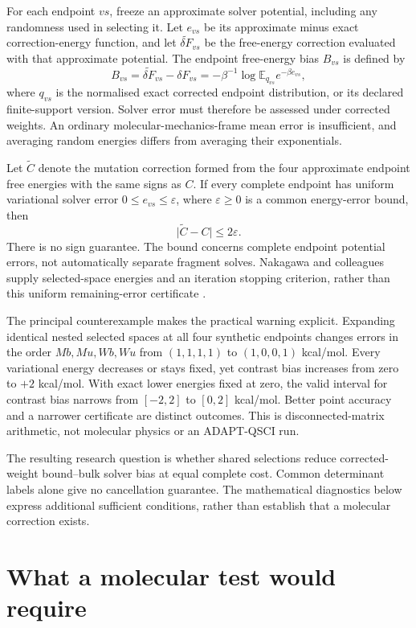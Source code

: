 \documentclass{article}
\begin{document}
For each endpoint \(vs\), freeze an approximate solver potential, including any randomness used in selecting it. Let \(e_{vs}\) be its approximate minus exact correction-energy function, and let \(\widetilde{\delta F}_{vs}\) be the free-energy correction evaluated with that approximate potential. The endpoint free-energy bias \(B_{vs}\) is defined by
\[
B_{vs}=\widetilde{\delta F}_{vs}-\delta F_{vs}
 =-\beta^{-1}\log\mathbb E_{q_{vs}}e^{-\beta e_{vs}},
\]
where \(q_{vs}\) is the normalised exact corrected endpoint distribution, or its declared finite-support version. Solver error must therefore be assessed under corrected weights. An ordinary molecular-mechanics-frame mean error is insufficient, and averaging random energies differs from averaging their exponentials.

Let \(\widetilde C\) denote the mutation correction formed from the four approximate endpoint free energies with the same signs as \(C\). If every complete endpoint has uniform variational solver error \(0\leq e_{vs}\leq\varepsilon\), where \(\varepsilon\geq0\) is a common energy-error bound, then
\[
\lvert\widetilde C-C\rvert\leq2\varepsilon.
\]
There is no sign guarantee. The bound concerns complete endpoint potential errors, not automatically separate fragment solves. Nakagawa and colleagues supply selected-space energies and an iteration stopping criterion, rather than this uniform remaining-error certificate \cite{P}.

The principal counterexample makes the practical warning explicit. Expanding identical nested selected spaces at all four synthetic endpoints changes errors in the order \(Mb,Mu,Wb,Wu\) from \((1,1,1,1)\) to \((1,0,0,1)\) kcal/mol. Every variational energy decreases or stays fixed, yet contrast bias increases from zero to \(+2\) kcal/mol. With exact lower energies fixed at zero, the valid interval for contrast bias narrows from \([-2,2]\) to \([0,2]\) kcal/mol. Better point accuracy and a narrower certificate are distinct outcomes. This is disconnected-matrix arithmetic, not molecular physics or an ADAPT-QSCI run.

The resulting research question is whether shared selections reduce corrected-weight bound--bulk solver bias at equal complete cost. Common determinant labels alone give no cancellation guarantee. The mathematical diagnostics below express additional sufficient conditions, rather than establish that a molecular correction exists.

\section{What a molecular test would require}
\end{document}
